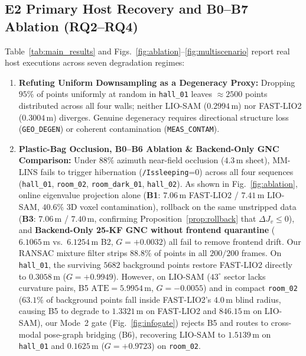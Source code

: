 \documentclass[journal]{IEEEtran}
\begin{document}
\subsection{E2 Primary Host Recovery and B0--B7 Ablation (RQ2--RQ4)}
Table~\ref{tab:main_results} and Figs.~\ref{fig:ablation}--\ref{fig:multiscenario} report real host executions across seven degradation regimes:
\begin{enumerate}
    \item \textbf{Refuting Uniform Downsampling as a Degeneracy Proxy:} Dropping $95\%$ of points uniformly at random in \texttt{hall\_01} leaves $\approx 2500$ points distributed across all four walls; neither LIO-SAM ($0.2994\,\mathrm{m}$) nor FAST-LIO2 ($0.3004\,\mathrm{m}$) diverges. Genuine degeneracy requires directional structure loss (\texttt{GEO\_DEGEN}) or coherent contamination (\texttt{MEAS\_CONTAM}).
    \item \textbf{Plastic-Bag Occlusion, B0--B6 Ablation \& Backend-Only GNC Comparison:} Under $88\%$ azimuth near-field occlusion ($4.3\,\mathrm{m}$ sheet), MM-LINS fails to trigger hibernation (\texttt{/Issleeping}=0) across all four sequences (\texttt{hall\_01}, \texttt{room\_02}, \texttt{room\_dark\_01}, \texttt{hall\_02}). As shown in Fig.~\ref{fig:ablation}, online eigenvalue projection alone (\textbf{B1}: $7.06\,\mathrm{m}$ FAST-LIO2 / $7.41\,\mathrm{m}$ LIO-SAM, $40.6\%$ 3D voxel contamination), rollback on the same unstripped data (\textbf{B3}: $7.06\,\mathrm{m}$ / $7.40\,\mathrm{m}$, confirming Proposition~\ref{prop:rollback} that $\Delta J_v \le 0$), and \textbf{Backend-Only 25-KF GNC without frontend quarantine} ($6.1065\,\mathrm{m}$ vs.\ $6.1254\,\mathrm{m}$ B2, $G=+0.0032$) all fail to remove frontend drift. Our RANSAC mixture filter strips $88.8\%$ of points in all $200/200$ frames. On \texttt{hall\_01}, the surviving $5682$ background points restore FAST-LIO2 directly to $\mathbf{0.3058\,\mathrm{m}}$ ($G=+0.9949$). However, on LIO-SAM ($43^\circ$ sector lacks curvature pairs, B5 $\mathrm{ATE}=5.9954\,\mathrm{m}$, $G=-0.0055$) and in compact \texttt{room\_02} ($63.1\%$ of background points fall inside FAST-LIO2's $4.0\,\mathrm{m}$ blind radius, causing B5 to degrade to $1.3321\,\mathrm{m}$ on FAST-LIO2 and $846.15\,\mathrm{m}$ on LIO-SAM), our Mode~2 gate (Fig.~\ref{fig:infogate}) rejects B5 and routes to cross-modal pose-graph bridging (B6), recovering LIO-SAM to $1.5139\,\mathrm{m}$ on \texttt{hall\_01} and $0.1625\,\mathrm{m}$ ($G=+0.9723$) on \texttt{room\_02}.

\end{enumerate}
\end{document}
